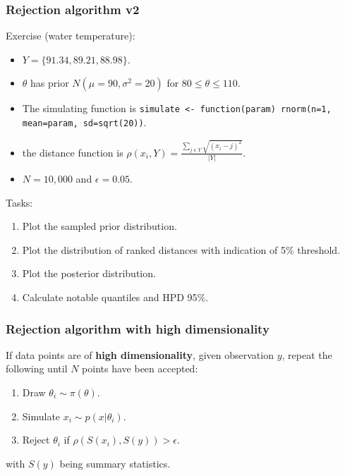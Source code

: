 \documentclass{beamer}
\newcommand{\1}{\ensuremath{\mathbf{1}}}
\begin{document}
%
%
%
\begin{frame}\frametitle{Rejection algorithm v2}
	Exercise (water temperature):
	\begin{itemize}
		\item $Y = \{91.34, 89.21, 88.98\}$.
		\item $\theta$ has prior $N(\mu = 90, \sigma^2 = 20)$ for $80 \leq \theta \leq 110$.
		\item The simulating function is \texttt{simulate <- function(param) rnorm(n=1, mean=param, sd=sqrt(20))}.
		\item the distance function is $\rho(x_i,Y) = \tfrac{\sum_{j \in Y}\sqrt{(x_i - j)^2}}{|Y|}$.
		\item $N=10,000$ and $\epsilon=0.05$.
	\end{itemize}
	Tasks:
	\begin{enumerate}
		\item Plot the sampled prior distribution.
		\item Plot the distribution of ranked distances with indication of 5\% threshold.
		\item Plot the posterior distribution.
		\item Calculate notable quantiles and HPD 95\%.
	\end{enumerate}
\end{frame}
%
%
%
\begin{frame}\frametitle{Rejection algorithm with high dimensionality}
	If data points are of \textbf{high dimensionality}, given observation $y$, repeat the following until $N$ points have been accepted:
	\begin{enumerate}
		\item Draw $\theta_i \sim \pi(\theta)$.
		\item Simulate $x_i \sim p(x|\theta_i)$.
		\item Reject $\theta_i$ if $\rho(S(x_i), S(y)) > \epsilon$.
	\end{enumerate}
	with $S(y)$ being summary statistics.
\end{frame}
%
%
%
\end{document}
